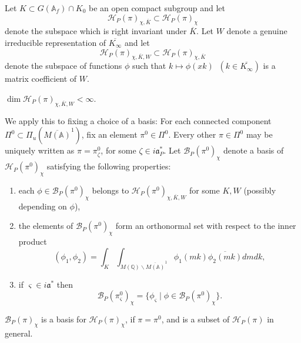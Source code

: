 Let $K\subset G({\mathbb{A}}_f)\cap K_0$ be an open compact subgroup and let 
\begin{equation}\label{eq:5.10}
{\mathcal H}_P(\pi )_{\chi ,\overline{K}}\subset {\mathcal H}_P(\pi )_\chi 
\end{equation}
denote the subspace which is right invariant under
$\overline{K}$. Let $W$ denote a genuine
irreducible representation of $\overline{K_\infty} $ and let 
\begin{equation}\label{eq:5.11}
{\mathcal H}_P(\pi )_{\chi ,\overline{K},W}
\subset {\mathcal H}_P(\pi )_{\chi ,\overline{K}}
\end{equation}
denote the subspace of functions $\phi $ such that
$k\longmapsto \phi (xk)\;\;(k\in \overline{K_\infty} )$
is a matrix coefficient of $W$.

\begin{proposition}\label{prop:5.7}
$\dim {\mathcal H}_P(\pi )_{\chi ,\overline{K},W}<\infty .$
\end{proposition}

We apply this to fixing a choice of a basis:
For each connected component $\Pi^0\subset
\Pi_u(\overline{M({\mathbb{A}})}^1)$, fix an element $\pi^0\in \Pi^0$.
Every other $\pi\in\Pi^0$ may be uniquely written as
$\pi=\pi^0_\zeta$, for some $\zeta\in i{\mathfrak{a}}^*_P$.
Let ${\mathcal B}_P(\pi^0 )_\chi $
denote a basis of ${\mathcal H}_P(\pi^0 )_\chi $ satisfying the following
properties:

\begin{enumerate}
\item  each $\phi \in {\mathcal B}_P(\pi^0 )_\chi $ belongs to
${\mathcal H}_P(\pi^0)_{\chi ,\overline{K},W}$
for some $K,W$ (possibly depending on $\phi $),

\item  the elements of ${\mathcal B}_P(\pi^0 )_\chi $
form an orthonormal set with
respect to the inner product
\[
(\phi _1,\phi _2)=
\int_K\int_{M({\mathbb{Q}})\backslash \overline{M({\mathbb{A}})}^1}
\phi _1(mk)\overline{\phi _2(mk)}dmdk,
\]

\item  if $\varsigma \in i{\mathfrak{a}}^{*}$ then 
\[
{\mathcal B}_P(\pi^0_\varsigma )_\chi =\{\phi _\varsigma \;|\;
\phi \in {\mathcal B}_P(\pi^0 )_\chi \}.
\]
\end{enumerate}

${\mathcal B}_P(\pi)_\chi$ is a basis for
${\mathcal H}_P(\pi)_\chi$, if $\pi=\pi^0$, and is a subset of
${\mathcal H}_P(\pi)$ in general.

